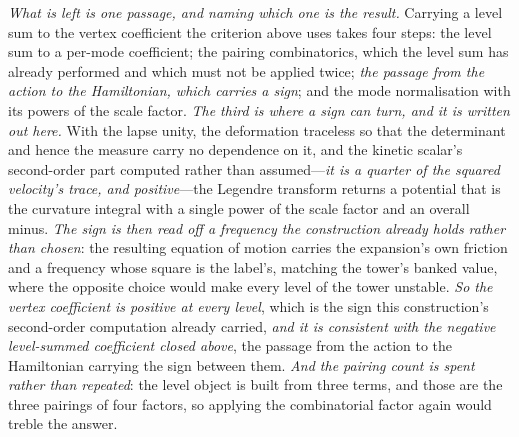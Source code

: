 \documentclass[11pt,a4paper]{article}
\theoremstyle{plain}
\theoremstyle{definition}
\theoremstyle{remark}
\begin{document}
\emph{What is left is one passage, and naming which one is the result.} Carrying a level sum to the vertex
coefficient the criterion above uses takes four steps: the level sum to a per-mode coefficient; the pairing
combinatorics, which the level sum has already performed and which must not be applied twice; \emph{the passage
from the action to the Hamiltonian, which carries a sign}; and the mode normalisation with its powers of the
scale factor. \emph{The third is where a sign can turn, and it is written out here.} With the lapse unity, the deformation
traceless so that the determinant and hence the measure carry no dependence on it, and the kinetic scalar's
second-order part computed rather than assumed---\emph{it is a quarter of the squared velocity's trace, and
positive}---the Legendre transform returns a potential that is the curvature integral with a single power of
the scale factor and an overall minus. \emph{The sign is then read off a frequency the construction already
holds rather than chosen}: the resulting equation of motion carries the expansion's own friction and a
frequency whose square is the label's, matching the tower's banked value, where the opposite choice would make
every level of the tower unstable. \emph{So the vertex coefficient is positive at every level}, which is the
sign this construction's second-order computation already carried, \emph{and it is consistent with the negative
level-summed coefficient closed above}, the passage from the action to the Hamiltonian carrying the sign
between them. \emph{And the pairing count is spent rather than
repeated}: the level object is built from three terms, and those are the three pairings of four factors, so
applying the combinatorial factor again would treble the
answer.
\end{document}
